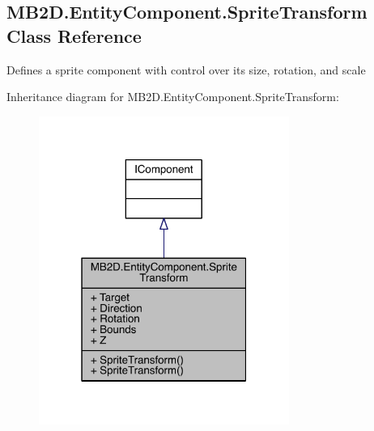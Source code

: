 \hypertarget{class_m_b2_d_1_1_entity_component_1_1_sprite_transform}{}\subsection{M\+B2\+D.\+Entity\+Component.\+Sprite\+Transform Class Reference}
\label{class_m_b2_d_1_1_entity_component_1_1_sprite_transform}


Defines a sprite component with control over its size, rotation, and scale  




Inheritance diagram for M\+B2\+D.\+Entity\+Component.\+Sprite\+Transform\+:
\nopagebreak
\begin{figure}[H]
\begin{center}
\leavevmode
\includegraphics[width=232pt]{class_m_b2_d_1_1_entity_component_1_1_sprite_transform__inherit__graph}
\end{center}
\end{figure}


